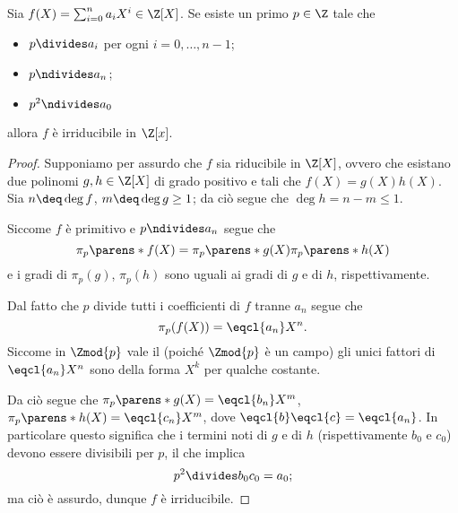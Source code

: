 \begin{proposition}
    Sia $f(X) = \sum_{i=0}^n a_iX^i \in \Z[X]$. Se esiste un primo $p \in \Z$ tale che 
    \begin{itemize}
        \item $p \divides a_i$ per ogni $i = 0, \dots, n-1$;
        \item $p \ndivides a_n$;
        \item $p^2 \ndivides a_0$
    \end{itemize}
    allora $f$ è irriducibile in $\Z[x]$.
\end{proposition}
\begin{proof}
    Supponiamo per assurdo che $f$ sia riducibile in $\Z[X]$, ovvero che esistano due polinomi $g, h \in \Z[X]$ di grado positivo e tali che $f(X) = g(X)h(X)$. Sia $n \deq \deg f$, $m \deq \deg g \geq 1$; da ciò segue che $\deg h = n - m \leq 1$.

    Siccome $f$ è primitivo e $p \ndivides a_n$ segue che \[
        \pi_p\parens*{f(X)} = \pi_p\parens*{g(X)}\pi_p\parens*{h(X)}
    \] e i gradi di $\pi_p(g)$, $\pi_p(h)$ sono uguali ai gradi di $g$ e di $h$, rispettivamente.

    Dal fatto che $p$ divide tutti i coefficienti di $f$ tranne $a_n$ segue che \[
        \pi_p(f(X)) = \eqcl{a_n}X^n.
    \] Siccome in $\Zmod{p}$ vale il  (poiché $\Zmod{p}$ è un campo) gli unici fattori di $\eqcl{a_n}X^n$ sono della forma $X^k$ per qualche costante. 
    
    Da ciò segue che $\pi_p\parens*{g(X)} = \eqcl{b_n}X^m$, $\pi_p\parens*{h(X)} = \eqcl{c_n}X^m$, dove $\eqcl{b}\eqcl{c} = \eqcl{a_n}$. In particolare questo significa che i termini noti di $g$ e di $h$ (rispettivamente $b_0$ e $c_0$) devono essere divisibili per $p$, il che implica \[
        p^2 \divides b_0c_0 = a_0;
    \] ma ciò è assurdo, dunque $f$ è irriducibile.
\end{proof}